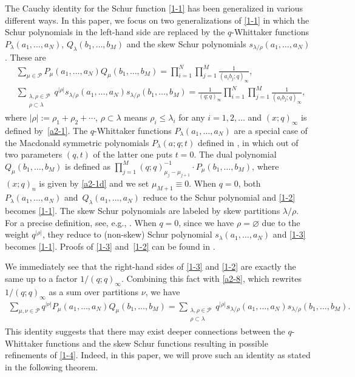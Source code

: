 \documentclass[11pt]{article}
\numberwithin{equation}{section}
\numberwithin{equation}{section}
\def\i{\infty}
\def\l{\lambda}
\def\Pe{\mathcal{P}}
\begin{document}
 The Cauchy identity for the Schur function \eqref{1-1} has been generalized in various different ways. In this paper, we focus on two generalizations of \eqref{1-1} in which the Schur polynomials in the left-hand side are replaced by the $q$-Whittaker functions $P_{\l}(a_1,\dots,a_N)$, $Q_{\l}(b_1,\dots,b_M)$ and the skew Schur polynomials $s_{\l/\rho}(a_1,\dots,a_N)$. These are
 \begin{align}
 \label{1-3}
 &\sum_{\mu\in\Pe}P_{\mu}(a_1,\dots,a_N)
 Q_{\mu}(b_1,\dots,b_M)
 =
 \prod_{i=1}^N\prod_{j=1}^M\frac{1}{(a_ib_j;q)_{\i}},
 \\
 \label{1-2}
 &\sum_{\substack{\l,\rho\in\Pe\\
 \rho\subset \l
 }}q^{|\rho|}s_{\l/\rho}(a_1,\dots,a_N)s_{\l/\rho}(b_1,\dots,b_M)
 =
 \frac{1}{(q;q)_\i}
 \prod_{i=1}^N\prod_{j=1}^M\frac{1}{(a_ib_j;q)_{\i}},
 \end{align}
 where $|\rho|:=\rho_1+\rho_2+\cdots$, $\rho\subset\l$ means $\rho_i\le \l_i$ for any $i=1,2,\dots$ and $(x;q)_{\i}$ is defined by~\eqref{a2-1}. The $q$-Whittaker functions $P_{\l}(a_1,\dots,a_N)$ are a special case of the Macdonald symmetric polynomials $P_{\l}(a;q;t)$ defined in \cite[Chapter~VI]{macdonald1998symmetric}, in which out of two parameters $(q,t)$ of the latter one puts $t=0$. The dual polynomial $Q_{\mu}(b_1,\dots,b_M)$ is defined as
 $
 \prod_{j=1}^M (q;q)_{\mu_j-\mu_{j+1}}^{-1}\cdot P_{\mu}(b_1,\dots,b_M)$,
 where $(x;q)_n$ is given by \eqref{a2-1d} and we set $\mu_{M+1}\equiv 0$. When $q=0$, both $P_{\l}(a_1,\dots,a_N)$ and~${Q_{\l}(a_1,\dots,a_N)}$ reduce to the Schur polynomial and \eqref{1-2} becomes \eqref{1-1}. The skew Schur polynomials \smash{$s_{\l/\rho}(a_1,\dots,a_N)$} are labeled by skew partitions $\l/\rho$. For a precise definition, see, e.g., \cite[Chapter~I]{macdonald1998symmetric}. When $q=0$, since we have $\rho=\varnothing$ due to the weight $q^{|\rho|}$, they reduce to (non-skew) Schur polynomial $s_{\l}(a_1,\dots,a_N)$ and \eqref{1-3} becomes \eqref{1-1}. Proofs of \eqref{1-3} and~\eqref{1-2} can be found in \cite[Sections~VI.4 and~I.5.28\,(a)]{macdonald1998symmetric}.

 We immediately see that the right-hand sides of \eqref{1-3} and \eqref{1-2} are exactly the same up to a factor $1/(q;q)_{\i}$. Combining this fact with \eqref{a2-8}, which rewrites $1/(q;q)_{\i}$ as a sum over partitions $\nu$, we have
 \begin{align}
 \label{1-4}
 \sum_{\mu,\nu\in\Pe}q^{|\nu|}P_{\mu}(a_1,\dots,a_N)
 Q_{\mu}(b_1,\dots,b_M)
 =
 \sum_{\substack{\l,\rho\in\Pe\\ \rho\subset\l}}q^{|\rho|}s_{\l/\rho}(a_1,\dots,a_N)s_{\l/\rho}(b_1,\dots,b_M).
 \end{align}
 This identity suggests that there may exist deeper connections between the $q$-Whittaker functions and the skew Schur functions resulting in possible refinements of \eqref{1-4}.
 Indeed, in this paper, we will prove such an identity as stated in the following theorem.
\end{document}
